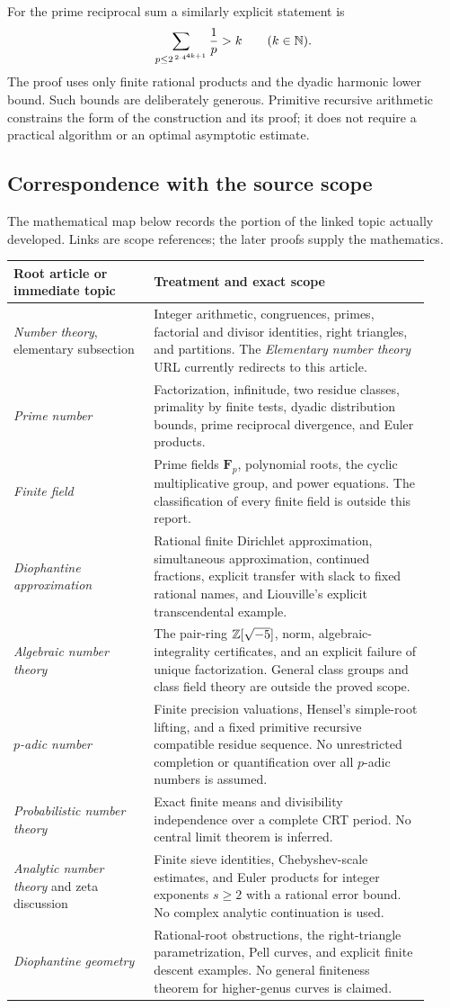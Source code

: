 For the prime reciprocal sum a similarly explicit statement is
\[
 \sum_{p\le 2^{\,2\cdot4^{4k+1}}}\frac1p>k\qquad(k\in\mathbb N).
\]
The proof uses only finite rational products and the dyadic harmonic lower bound. Such bounds are deliberately generous. Primitive recursive arithmetic constrains the form of the construction and its proof; it does not require a practical algorithm or an optimal asymptotic estimate.

\subsection*{Correspondence with the source scope}
The mathematical map below records the portion of the linked topic actually developed. Links are scope references; the later proofs supply the mathematics.
\begin{longtable}{p{0.31\linewidth}p{0.61\linewidth}}
\toprule
Root article or immediate topic & Treatment and exact scope\\
\midrule\endhead
\emph{Number theory}, elementary subsection & Integer arithmetic, congruences, primes, factorial and divisor identities, right triangles, and partitions. The \emph{Elementary number theory} URL currently redirects to this article.\\
\emph{Prime number} & Factorization, infinitude, two residue classes, primality by finite tests, dyadic distribution bounds, prime reciprocal divergence, and Euler products.\\
\emph{Finite field} & Prime fields $\mathbf F_p$, polynomial roots, the cyclic multiplicative group, and power equations. The classification of every finite field is outside this report.\\
\emph{Diophantine approximation} & Rational finite Dirichlet approximation, simultaneous approximation, continued fractions, explicit transfer with slack to fixed rational names, and Liouville's explicit transcendental example.\\
\emph{Algebraic number theory} & The pair-ring $\mathbb Z[\sqrt{-5}]$, norm, algebraic-integrality certificates, and an explicit failure of unique factorization. General class groups and class field theory are outside the proved scope.\\
\emph{$p$-adic number} & Finite precision valuations, Hensel's simple-root lifting, and a fixed primitive recursive compatible residue sequence. No unrestricted completion or quantification over all $p$-adic numbers is assumed.\\
\emph{Probabilistic number theory} & Exact finite means and divisibility independence over a complete CRT period. No central limit theorem is inferred.\\
\emph{Analytic number theory} and zeta discussion & Finite sieve identities, Chebyshev-scale estimates, and Euler products for integer exponents $s\ge2$ with a rational error bound. No complex analytic continuation is used.\\
\emph{Diophantine geometry} & Rational-root obstructions, the right-triangle parametrization, Pell curves, and explicit finite descent examples. No general finiteness theorem for higher-genus curves is claimed.\\
\bottomrule
\end{longtable}

